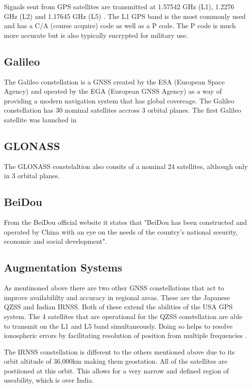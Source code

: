 Signals sent from GPS satellites
are transmitted at 1.57542 GHz (L1), 1.2276 GHz (L2) and 1.17645 GHz (L5) .
The L1 GPS band is the most commonly used and has a C/A (course acquire) code as well as a P code. The P code is much more accurate but is also typically encrypted for
military use.

\subsection{Galileo} \label{subsec:GNSS_GalileoIntro}
The Galileo constellation is a GNSS created by the ESA (European Space Agency) and opeated by the EGA (European GNSS Agency) as a way of providing a modern navigation
system that has global covereage. The Galileo constellation has 30 nominal satellites accross 3 orbital planes. The first Galileo satellite was launched in 

\subsection{GLONASS} \label{subsec:GNSS_GLONASSIntro}
The GLONASS constelaltion also consits of a nominal 24 satellites, although only in 3 orbital planes. 

\subsection{BeiDou} \label{subsec:GNSS_BeiDouIntro}
From the BeiDou official website it states that "BeiDou has been constructed and operated by China with an eye on the needs of the country's national sceurity, economic
and social development".

\subsection{Augmentation Systems} \label{subsec:GNSS_OtherIntro}
As mentinoned above there are two other GNSS constellations that act to improve availabililty and accuracy in regional areas. These are the Japanese QZSS and Indian
IRNSS. Both of these extend the abilities of the USA GPS system. The 4 satellites that are operational for the QZSS constellation are able to transmit on the L1 and L5
band  simultaneously. Doing so helps to resolve ionospheric errors by facilitating resolution of position from multiple frequencies \cite{RN48}.

The IRNSS constellation is different to the others mentioned above due to its orbit altitude of 36,000km making them geostation. All of the satellites are postiioned at
this orbit. This allows for a very narrow and defined region of useability, which is over India. 


